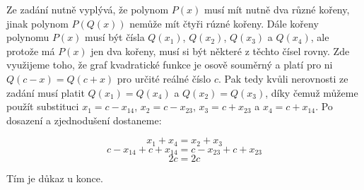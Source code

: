 \documentclass{fkssolpub}
\author{Ondřej Sedláček}
\begin{document}
Ze zadání nutně vyplývá, že polynom $P(x)$ musí mít nutně dva různé kořeny,
jinak polynom $P(Q(x))$ nemůže mít čtyři rúzné kořeny. Dále kořeny polynomu
$P(x)$ musí být čísla $Q(x_1)$, $Q(x_2)$, $Q(x_3)$ a $Q(x_4)$, ale protože
má $P(x)$ jen dva kořeny, musí si být některé z těchto čísel rovny. Zde využijeme
toho, že graf kvadratické funkce je osově souměrný a platí pro ni
$Q(c - x) = Q(c + x)$ pro určité reálné číslo $c$. Pak tedy kvůli nerovnosti
ze zadání musí platit $Q(x_1) = Q(x_4)$ a $Q(x_2) = Q(x_3)$, díky čemuž můžeme
použít substituci $x_1 = c - x_{14}$, $x_2 = c - x_{23}$, $x_3 = c + x_{23}$ a
$x_4 = c + x_{14}$. Po dosazení a zjednodušení dostaneme:

\[
	x_1 + x_4 = x_2 + x_3
\]
\[
	c - x_{14} + c + x_{14} = c - x_{23} + c + x_{23}
\]
\[
	2c = 2c
\]

Tím je důkaz u konce.
\end{document}
